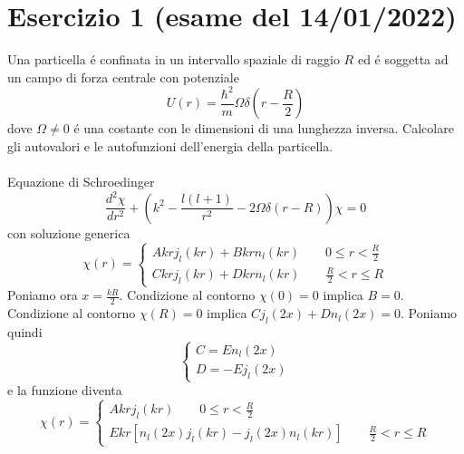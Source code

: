 \documentclass[a4paper]{article}
\begin{document}
    \section*{Esercizio 1 (esame del 14/01/2022)}
        Una particella \'e confinata in un intervallo spaziale di raggio $R$ ed \'e soggetta ad un campo di forza centrale con potenziale
        \begin{equation*}
            U(r)=\frac{\hbar^2}{m}\Omega\delta(r-\frac{R}{2})
        \end{equation*}
        dove $\Omega\neq 0$ \'e una costante con le dimensioni di una lunghezza inversa.
        Calcolare gli autovalori e le autofunzioni dell'energia della particella.
        \\
        \\
        Equazione di Schroedinger
        \begin{equation*}
            \frac{d^2\chi}{dr^2}+\left(k^2-\frac{l(l+1)}{r^2}-2\Omega\delta(r-R)\right)\chi=0
        \end{equation*}
        con soluzione generica
        \begin{equation*}
            \chi(r)=
            \begin{cases}
                Akrj_l(kr)+Bkrn_l(kr)\quad\quad 0\leq r<\frac{R}{2}\\
                Ckrj_l(kr)+Dkrn_l(kr)\quad\quad \frac{R}{2}<r\leq R
            \end{cases}
        \end{equation*}
        Poniamo ora $x=\frac{kR}{2}$.
        Condizione al contorno $\chi(0)=0$ implica $B=0$.
        Condizione al contorno $\chi(R)=0$ implica $Cj_l(2x)+Dn_l(2x)=0$.
        Poniamo quindi
        \begin{equation*}
            \begin{cases}
                C=En_l(2x)\\
                D=-Ej_l(2x)
            \end{cases}
        \end{equation*}
        e la funzione diventa
        \begin{equation*}
            \chi(r)=
            \begin{cases}
                Akrj_l(kr)\quad\quad 0\leq r<\frac{R}{2}\\
                Ekr\left[n_l(2x)j_l(kr)-j_l(2x)n_l(kr)\right]\quad\quad \frac{R}{2}<r\leq R
            \end{cases}
        \end{equation*}
\end{document}
